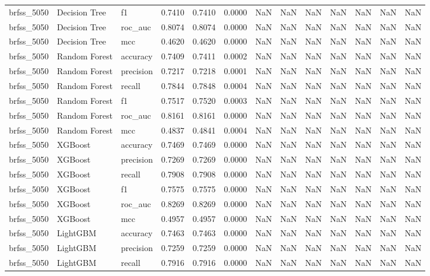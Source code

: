 \begin{tabular}{lllrrrllrrrrr}
brfss\_5050 & Decision Tree & f1 & 0.7410 & 0.7410 & 0.0000 & NaN & NaN & NaN & NaN & NaN & NaN & NaN \\
brfss\_5050 & Decision Tree & roc\_auc & 0.8074 & 0.8074 & 0.0000 & NaN & NaN & NaN & NaN & NaN & NaN & NaN \\
brfss\_5050 & Decision Tree & mcc & 0.4620 & 0.4620 & 0.0000 & NaN & NaN & NaN & NaN & NaN & NaN & NaN \\
brfss\_5050 & Random Forest & accuracy & 0.7409 & 0.7411 & 0.0002 & NaN & NaN & NaN & NaN & NaN & NaN & NaN \\
brfss\_5050 & Random Forest & precision & 0.7217 & 0.7218 & 0.0001 & NaN & NaN & NaN & NaN & NaN & NaN & NaN \\
brfss\_5050 & Random Forest & recall & 0.7844 & 0.7848 & 0.0004 & NaN & NaN & NaN & NaN & NaN & NaN & NaN \\
brfss\_5050 & Random Forest & f1 & 0.7517 & 0.7520 & 0.0003 & NaN & NaN & NaN & NaN & NaN & NaN & NaN \\
brfss\_5050 & Random Forest & roc\_auc & 0.8161 & 0.8161 & 0.0000 & NaN & NaN & NaN & NaN & NaN & NaN & NaN \\
brfss\_5050 & Random Forest & mcc & 0.4837 & 0.4841 & 0.0004 & NaN & NaN & NaN & NaN & NaN & NaN & NaN \\
brfss\_5050 & XGBoost & accuracy & 0.7469 & 0.7469 & 0.0000 & NaN & NaN & NaN & NaN & NaN & NaN & NaN \\
brfss\_5050 & XGBoost & precision & 0.7269 & 0.7269 & 0.0000 & NaN & NaN & NaN & NaN & NaN & NaN & NaN \\
brfss\_5050 & XGBoost & recall & 0.7908 & 0.7908 & 0.0000 & NaN & NaN & NaN & NaN & NaN & NaN & NaN \\
brfss\_5050 & XGBoost & f1 & 0.7575 & 0.7575 & 0.0000 & NaN & NaN & NaN & NaN & NaN & NaN & NaN \\
brfss\_5050 & XGBoost & roc\_auc & 0.8269 & 0.8269 & 0.0000 & NaN & NaN & NaN & NaN & NaN & NaN & NaN \\
brfss\_5050 & XGBoost & mcc & 0.4957 & 0.4957 & 0.0000 & NaN & NaN & NaN & NaN & NaN & NaN & NaN \\
brfss\_5050 & LightGBM & accuracy & 0.7463 & 0.7463 & 0.0000 & NaN & NaN & NaN & NaN & NaN & NaN & NaN \\
brfss\_5050 & LightGBM & precision & 0.7259 & 0.7259 & 0.0000 & NaN & NaN & NaN & NaN & NaN & NaN & NaN \\
brfss\_5050 & LightGBM & recall & 0.7916 & 0.7916 & 0.0000 & NaN & NaN & NaN & NaN & NaN & NaN & NaN \\

\end{tabular}
